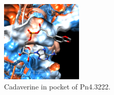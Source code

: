 \documentclass[12pt]{article}
\begin{document}
	\FloatBarrier
	
	
	\FloatBarrier
	\begin{figure}[h!]
		\centering
		\includegraphics[width=0.35\textwidth]{../6/known/Dock/chimera.png}
		\caption{\centering Cadaverine in pocket of Pn4.3222.}
		\label{fig8_4}
	\end{figure}
	\FloatBarrier

	\newpage
	
	
	
	
	\newpage
	\tableofcontents
	\listoffigures
	\listoftables
	
\end{document}
